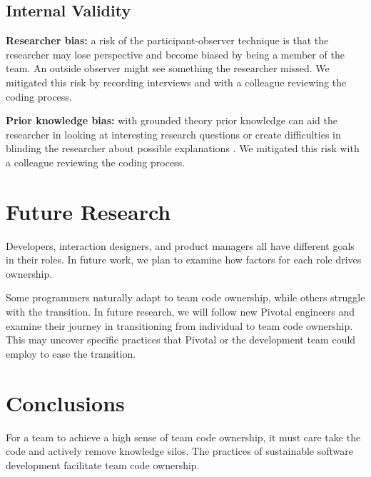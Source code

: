 \subsection{Internal Validity}
\textbf{Researcher bias:} a risk of the participant-observer technique is that the researcher may lose perspective and become biased by being a member of the team. An outside observer might see something the researcher missed. We mitigated this risk by recording interviews and with a colleague reviewing the coding process. 

\textbf{Prior knowledge bias:} with grounded theory prior knowledge can aid the researcher in looking at interesting research questions or create difficulties in blinding the researcher about possible explanations \cite{GlaserIssues}. We mitigated this risk with a colleague reviewing the coding process. 
\section{Future Research}
Developers, interaction designers, and product managers all have different goals in their roles. In future work, we plan to examine how factors for each role drives ownership.

Some programmers naturally adapt to team code ownership, while others struggle with the transition. In future research, we will follow new Pivotal engineers and examine their journey in transitioning from individual to team code ownership. This may uncover specific practices that Pivotal or the development team could employ to ease the transition. 

\section{Conclusions}
For a team to achieve a high sense of team code ownership, it must care take the code and actively remove knowledge silos. The practices of sustainable software development facilitate team code ownership.

